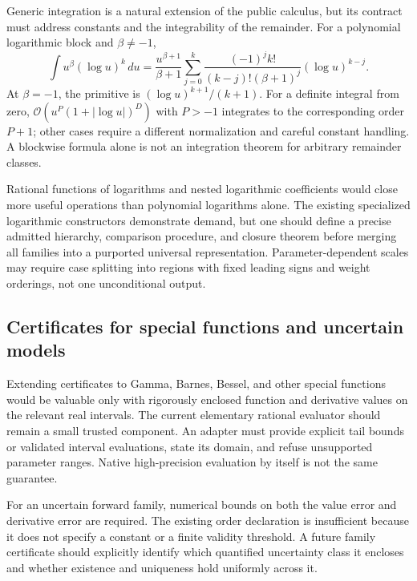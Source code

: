 \documentclass[11pt,a4paper]{article}
\newcommand{\OO}{\mathcal O}
\newcommand{\code}[1]{\texttt{\detokenize{#1}}}
\begin{document}
Generic integration is a natural extension of the public calculus, but its contract must address constants and the integrability of the remainder. For a polynomial logarithmic block and $\beta\ne-1$,
\begin{equation}
 \int u^\beta(\log u)^k\,du
 =\frac{u^{\beta+1}}{\beta+1}
   \sum_{j=0}^{k}\frac{(-1)^j k!}{(k-j)!(\beta+1)^j}(\log u)^{k-j}.
\end{equation}
At $\beta=-1$, the primitive is $(\log u)^{k+1}/(k+1)$. For a definite integral from zero, $\OO(u^P(1+|\log u|)^D)$ with $P>-1$ integrates to the corresponding order $P+1$; other cases require a different normalization and careful constant handling. A blockwise formula alone is not an integration theorem for arbitrary remainder classes.

Rational functions of logarithms and nested logarithmic coefficients would close more useful operations than polynomial logarithms alone. The existing specialized logarithmic constructors demonstrate demand, but one should define a precise admitted hierarchy, comparison procedure, and closure theorem before merging all families into a purported universal representation. Parameter-dependent scales may require case splitting into regions with fixed leading signs and weight orderings, not one unconditional output.

\subsection{Certificates for special functions and uncertain models}

Extending certificates to Gamma, Barnes, Bessel, and other special functions would be valuable only with rigorously enclosed function and derivative values on the relevant real intervals. The current elementary rational evaluator should remain a small trusted component. An adapter must provide explicit tail bounds or validated interval evaluations, state its domain, and refuse unsupported parameter ranges. Native high-precision evaluation by itself is not the same guarantee.\cite{cert,native,gamma}

For an uncertain forward family, numerical bounds on both the value error and derivative error are required. The existing \code{"InputRemainder"} order declaration is insufficient because it does not specify a constant or a finite validity threshold. A future family certificate should explicitly identify which quantified uncertainty class it encloses and whether existence and uniqueness hold uniformly across it.
\end{document}
